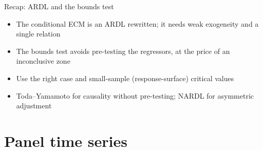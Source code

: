 \begin{frame}{Recap: ARDL and the bounds test}
\itemsize{\small}
\begin{itemize}
    \item The conditional ECM is an ARDL rewritten; it needs weak exogeneity and a single relation
    \item The bounds test avoids pre-testing the regressors, at the price of an inconclusive zone
    \item Use the right case and small-sample (response-surface) critical values
    \item Toda--Yamamoto for causality without pre-testing; NARDL for asymmetric adjustment
\end{itemize}
\end{frame}


\section{Panel time series}

